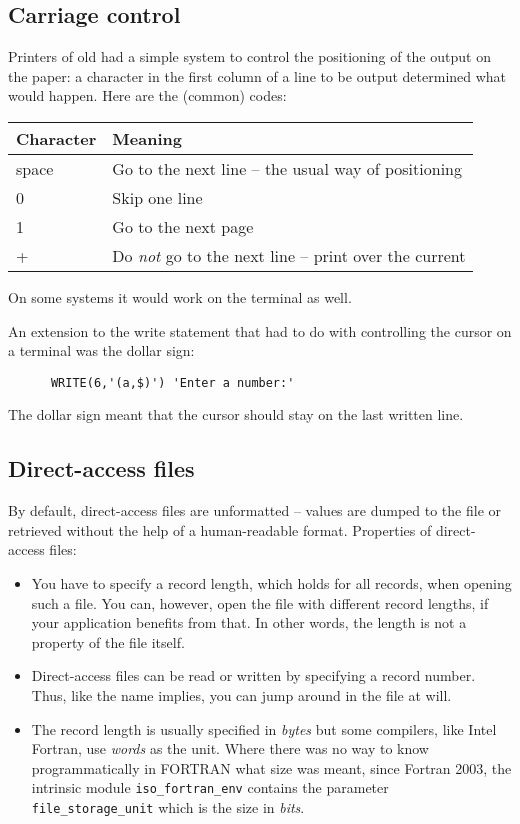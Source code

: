 \subsection{Carriage control}
Printers of old had a simple system to control the positioning of the output on the paper:
a character in the first column of a line to be output determined what would happen. Here
are the (common) codes:
\begin{table}[h!]
\begin{tabular}{ll}
\hline
Character    & Meaning \\
\hline
space        & Go to the next line -- the usual way of positioning \\
0            & Skip one line \\
1            & Go to the next page \\
+            & Do \emph{not} go to the next line -- print over the current \\
\end{tabular}
\end{table}

On some systems it would work on the terminal as well.

An extension to the write statement that had to do with controlling the cursor on a
terminal was the dollar sign:
\begin{verbatim}
      WRITE(6,'(a,$)') 'Enter a number:'
\end{verbatim}

The dollar sign meant that the cursor should stay on the last written line.


\subsection{Direct-access files}
By default, direct-access files are unformatted -- values are dumped to the file or retrieved
without the help of a human-readable format. Properties of direct-access files:
\begin{itemize}
\item
You have to specify a record length, which holds for all records, when opening such a file.
You can, however, open the file with different record lengths, if your application benefits
from that. In other words, the length is not a property of the file itself.
\item
Direct-access files can be read or written by specifying a record number. Thus, like the name
implies, you can jump around in the file at will.
\item
The record length is usually specified in \emph{bytes} but some compilers, like Intel Fortran,
use \emph{words} as the unit. Where there was no way to know programmatically in FORTRAN what
size was meant, since Fortran 2003, the intrinsic module \verb+iso_fortran_env+ contains the parameter \verb+file_storage_unit+
which is the size in \emph{bits}.
\end{itemize}

